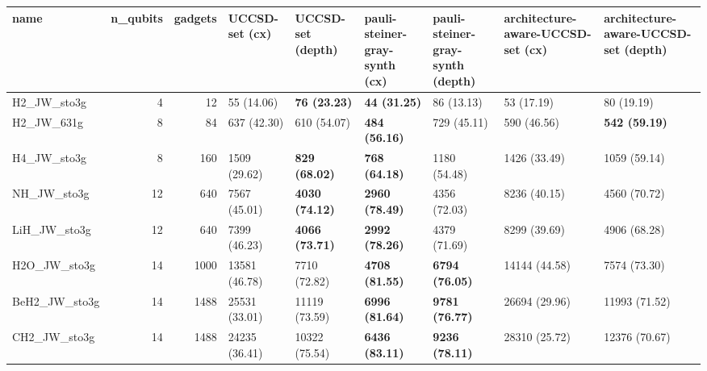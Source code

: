\begin{tabular}{lrrllllll}
\toprule
name & n\_qubits & gadgets & UCCSD-set (cx) & UCCSD-set (depth) & pauli-steiner-gray-synth (cx) & pauli-steiner-gray-synth (depth) & architecture-aware-UCCSD-set (cx) & architecture-aware-UCCSD-set (depth) \\
\midrule
H2\_JW\_sto3g & 4 & 12 & 55 (14.06) & \textbf{76 (23.23)} & \textbf{44 (31.25)} & 86 (13.13) & 53 (17.19) & 80 (19.19) \\
H2\_JW\_631g & 8 & 84 & 637 (42.30) & 610 (54.07) & \textbf{484 (56.16)} & 729 (45.11) & 590 (46.56) & \textbf{542 (59.19)} \\
H4\_JW\_sto3g & 8 & 160 & 1509 (29.62) & \textbf{829 (68.02)} & \textbf{768 (64.18)} & 1180 (54.48) & 1426 (33.49) & 1059 (59.14) \\
NH\_JW\_sto3g & 12 & 640 & 7567 (45.01) & \textbf{4030 (74.12)} & \textbf{2960 (78.49)} & 4356 (72.03) & 8236 (40.15) & 4560 (70.72) \\
LiH\_JW\_sto3g & 12 & 640 & 7399 (46.23) & \textbf{4066 (73.71)} & \textbf{2992 (78.26)} & 4379 (71.69) & 8299 (39.69) & 4906 (68.28) \\
H2O\_JW\_sto3g & 14 & 1000 & 13581 (46.78) & 7710 (72.82) & \textbf{4708 (81.55)} & \textbf{6794 (76.05)} & 14144 (44.58) & 7574 (73.30) \\
BeH2\_JW\_sto3g & 14 & 1488 & 25531 (33.01) & 11119 (73.59) & \textbf{6996 (81.64)} & \textbf{9781 (76.77)} & 26694 (29.96) & 11993 (71.52) \\
CH2\_JW\_sto3g & 14 & 1488 & 24235 (36.41) & 10322 (75.54) & \textbf{6436 (83.11)} & \textbf{9236 (78.11)} & 28310 (25.72) & 12376 (70.67) \\
\bottomrule
\end{tabular}
